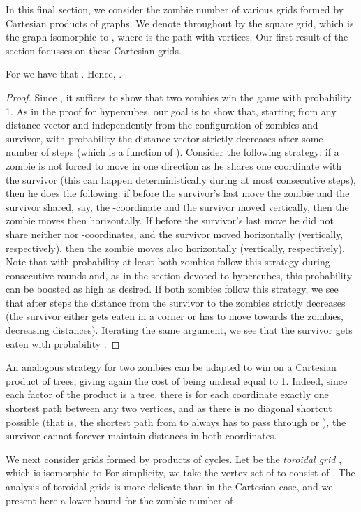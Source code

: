 \documentclass[12pt]{amsart}
\begin{document}
In this final section, we consider the zombie number of various grids formed by Cartesian products of graphs. We denote throughout by  the  square grid, which is the graph isomorphic to
, where  is the path with  vertices. Our first result of the section focusses on these Cartesian grids.
\begin{theorem}
For  we have that . Hence, .
\end{theorem}
\begin{proof}
Since , it suffices to show that two zombies win the game with probability 1.  As in the proof for hypercubes, our goal is to show that, starting from any distance vector and independently from the
configuration of zombies and survivor, with probability  the distance vector strictly decreases after some number of steps (which is a function of ). Consider the following strategy: if a zombie is not forced to move
in one direction as he shares one coordinate with the survivor (this can happen deterministically during at most  consecutive steps), then he does the following: if before the survivor's last
move the zombie and the survivor shared, say, the -coordinate and the survivor moved vertically, then the zombie moves then horizontally. If before the survivor's last move he did not share
neither  nor -coordinates, and the survivor moved horizontally (vertically, respectively), then the zombie moves also horizontally (vertically, respectively). Note that with probability at
least  both zombies follow this strategy during  consecutive rounds and, as in the section devoted to hypercubes, this probability can be boosted as high as desired. If both zombies follow this strategy, we
see that after  steps the distance from the survivor to the zombies strictly decreases (the survivor either gets eaten in a corner or has to move towards the zombies, decreasing distances).
Iterating the same argument, we see that the survivor gets eaten with probability .
\end{proof}

An analogous strategy for two zombies can be adapted to win on a Cartesian product of trees, giving again the cost of being undead equal to 1. Indeed, since each factor of the product is a tree, there is for each
coordinate exactly one shortest path between any two vertices, and as there is no diagonal shortcut possible (that is, the shortest path from  to  always has to pass through
 or ), the survivor cannot forever maintain distances in both coordinates.

\medskip

We next consider grids formed by products of cycles.  Let  be the \emph{toroidal grid} , which is isomorphic to  For simplicity, we take the vertex set of  to
consist of . The analysis of toroidal grids is more delicate than in the Cartesian case, and we present here a lower bound for the zombie number of 
\end{document}
